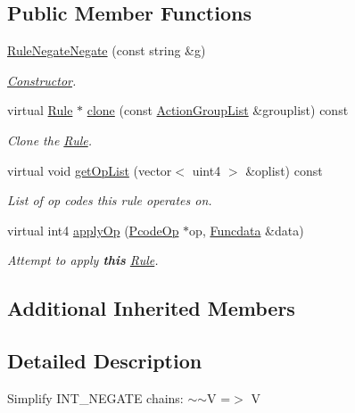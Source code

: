 \subsection*{Public Member Functions}
\begin{DoxyCompactItemize}
\item 
\mbox{\hyperlink{class_rule_negate_negate_af88d87dd49213bd59edbe986423418c3}{Rule\+Negate\+Negate}} (const string \&g)
\begin{DoxyCompactList}\small\item\em \mbox{\hyperlink{class_constructor}{Constructor}}. \end{DoxyCompactList}\item 
virtual \mbox{\hyperlink{class_rule}{Rule}} $\ast$ \mbox{\hyperlink{class_rule_negate_negate_a50298fc906e6a8335e63ce3c4f65f6e7}{clone}} (const \mbox{\hyperlink{class_action_group_list}{Action\+Group\+List}} \&grouplist) const
\begin{DoxyCompactList}\small\item\em Clone the \mbox{\hyperlink{class_rule}{Rule}}. \end{DoxyCompactList}\item 
virtual void \mbox{\hyperlink{class_rule_negate_negate_a587e4098de2c9d06501d0b8a1800afbf}{get\+Op\+List}} (vector$<$ uint4 $>$ \&oplist) const
\begin{DoxyCompactList}\small\item\em List of op codes this rule operates on. \end{DoxyCompactList}\item 
virtual int4 \mbox{\hyperlink{class_rule_negate_negate_a02dccbffcee07b90e8a7f6aab7bf1ccf}{apply\+Op}} (\mbox{\hyperlink{class_pcode_op}{Pcode\+Op}} $\ast$op, \mbox{\hyperlink{class_funcdata}{Funcdata}} \&data)
\begin{DoxyCompactList}\small\item\em Attempt to apply {\bfseries{this}} \mbox{\hyperlink{class_rule}{Rule}}. \end{DoxyCompactList}\end{DoxyCompactItemize}
\subsection*{Additional Inherited Members}


\subsection{Detailed Description}
Simplify I\+N\+T\+\_\+\+N\+E\+G\+A\+TE chains\+: {\ttfamily $\sim$$\sim$V =$>$ V} 

